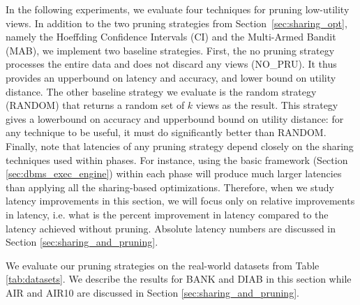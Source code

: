 In the following experiments, we evaluate four techniques for pruning low-utility views.
In addition to the two pruning strategies from Section~\ref{sec:sharing_opt}, 
namely the Hoeffding Confidence Intervals (CI) and the Multi-Armed Bandit (MAB),
we implement two baseline strategies.
First, the no pruning strategy processes the entire data and does not discard any views (NO\_PRU). 
It thus provides an upperbound on latency and accuracy, and lower bound on utility distance.
The other baseline strategy we evaluate is the random strategy (RANDOM) that returns a random 
set of $k$ views as the result.
This strategy gives a lowerbound on accuracy and upperbound bound on utility distance: for any 
technique to be useful, it must do significantly better than RANDOM.
Finally, note that latencies of any pruning strategy depend closely on the sharing techniques 
used within phases. 
For instance, using the basic \SeeDB framework (Section \ref{sec:dbms_exec_engine}) within each phase
will produce much larger latencies than applying all the sharing-based optimizations.
Therefore, when we study latency improvements in this section, we will focus only on relative 
improvements in latency, i.e. what is the percent improvement in latency compared to the latency
achieved without pruning.
Absolute latency numbers are discussed in Section \ref{sec:sharing_and_pruning}.


We evaluate our pruning strategies on the real-world datasets from Table \ref{tab:datasets}. 
We describe the results for BANK and DIAB in this section while AIR and AIR10 are discussed 
in Section \ref{sec:sharing_and_pruning}. 






